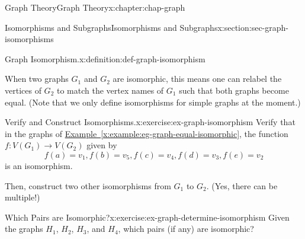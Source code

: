 \documentclass[oneside,10pt,]{book}
\newcommand{\xreffont}{\relax}
\numberwithin{equation}{section}
\begin{document}
\begin{chapterptx}{Graph Theory}{}{Graph Theory}{}{}{x:chapter:chap-graph}
\begin{sectionptx}{Isomorphisms and Subgraphs}{}{Isomorphisms and Subgraphs}{}{}{x:section:sec-graph-isomorphisms}
\begin{definition}{Graph Isomorphism.}{x:definition:def-graph-isomorphism}
\end{definition}
When two graphs \(G_1\) and \(G_2\) are isomorphic, this means one can relabel the vertices of \(G_2\) to match the vertex names of \(G_1\) such that both graphs become equal. (Note that we only define isomorphisms for simple graphs at the moment.)%
\begin{inlineexercise}{Verify and Construct Isomorphisms.}{x:exercise:ex-graph-isomorphism}%
Verify that in the graphs of \hyperref[x:example:eg-graph-equal-isomorphic]{Example~{\xreffont\ref{x:example:eg-graph-equal-isomorphic}}}, the function \(f: V(G_1) \rightarrow V(G_2)\) given by%
\begin{equation*}
f(a) = v_1, f(b) = v_5, f(c) = v_4, f(d) = v_3, f(e) = v_2
\end{equation*}
is an isomorphism.%
\par
Then, construct two other isomorphisms from \(G_1\) to \(G_2\). (Yes, there can be multiple!)%
\end{inlineexercise}
\begin{inlineexercise}{Which Pairs are Isomorphic?}{x:exercise:ex-graph-determine-isomorphism}%
Given the graphs \(H_1\), \(H_2\), \(H_3\), and \(H_4\), which pairs (if any) are isomorphic?%
\begin{sidebyside}{2}{0.055}{0.055}{0.11}%
\begin{sbspanel}{0.18}%
\end{sbspanel}
\end{sidebyside}
\end{inlineexercise}
\end{sectionptx}
\end{chapterptx}
\end{document}
